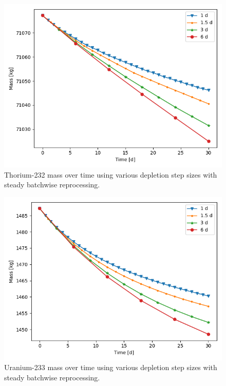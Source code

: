 {\begin{figure}[H]
  \centering
  \includegraphics[scale=0.7]{images/Th232_sp_comp.png}
  \caption{Thorium-232 mass over time using various depletion step sizes with steady batchwise reprocessing.}
   \label{fig:steady-batch-th}
\end{figure}

\begin{figure}[H]
  \centering
  \includegraphics[scale=0.7]{images/U233_sp_comp.png}
  \caption{Uranium-233 mass over time using various depletion step sizes with steady batchwise reprocessing.}
   \label{fig:steady-batch-u}
\end{figure}

}
